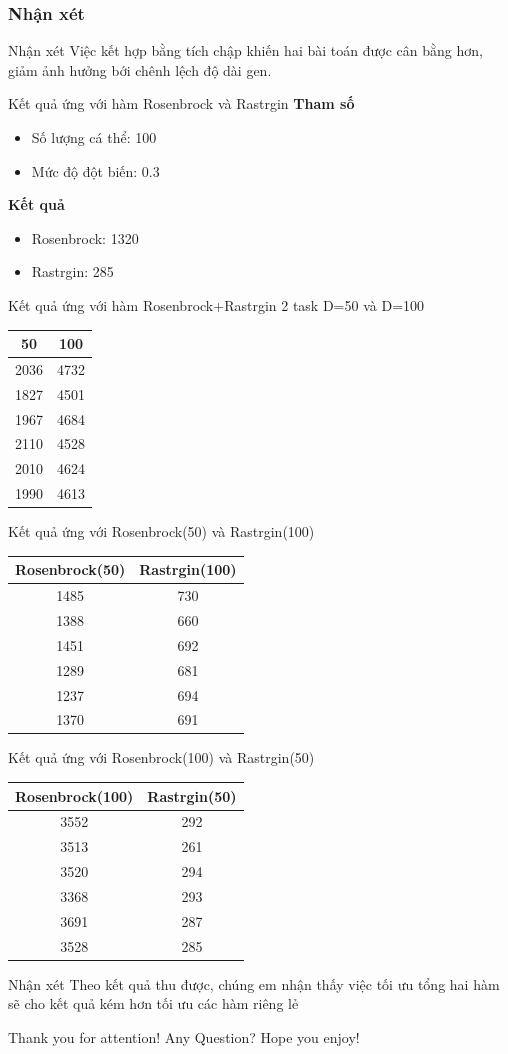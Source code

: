 \documentclass[compress]{beamer}
\begin{document}
\subsubsection{Nhận xét}
\begin{frame}{Nhận xét}
Việc kết hợp bằng tích chập khiến hai bài toán  được cân bằng hơn, giảm ảnh hưởng bới chênh lệch độ dài gen.
\end{frame}
\begin{frame}{Kết quả ứng với hàm Rosenbrock và Rastrgin }
\textbf{Tham số}
\begin{itemize}
\item Số lượng cá thể: 100
\item Mức độ đột biến: 0.3
\end{itemize}
\textbf{Kết quả} 
\begin{itemize}
\item Rosenbrock: 1320  
\item Rastrgin: 285
\end{itemize}
\end{frame}
\begin{frame}{Kết quả ứng với hàm Rosenbrock+Rastrgin 2 task   D=50 và D=100}
\begin{longtable}{|c |c |}
\hline
50 &100 \\
\hline
2036 & 4732\\
1827 & 4501\\
1967 & 4684\\
2110 & 4528\\
2010 & 4624\\
\hline
\hline
1990 & 4613\\ 
\hline
\end{longtable}
\end{frame}
\begin{frame}{Kết quả ứng với Rosenbrock(50) và Rastrgin(100)}
\begin{longtable}{|c |c |}
\hline
Rosenbrock(50) &Rastrgin(100) \\
\hline
1485 & 730\\
1388 & 660\\
1451 & 692\\
1289 & 681\\
1237 & 694\\
\hline
\hline
1370 & 691\\ 
\hline
\end{longtable}
\end{frame}
\begin{frame}{Kết quả ứng với Rosenbrock(100) và Rastrgin(50)}
\begin{longtable}{|c |c |}
\hline
Rosenbrock(100) &Rastrgin(50) \\
\hline
3552 & 292\\
3513 & 261\\
3520 & 294\\
3368 & 293\\
3691 & 287\\
\hline
\hline
3528 & 285\\ 
\hline
\end{longtable}
\end{frame}
\begin{frame}{Nhận xét}
Theo kết quả thu được, chúng em nhận thấy việc tối ưu tổng hai hàm sẽ cho kết quả kém hơn tối ưu các hàm riêng lẻ
\end{frame}
\begin{frame}[plain]{Thank you for attention! Any Question?}
Hope you enjoy!
\end{frame}
\end{document}
